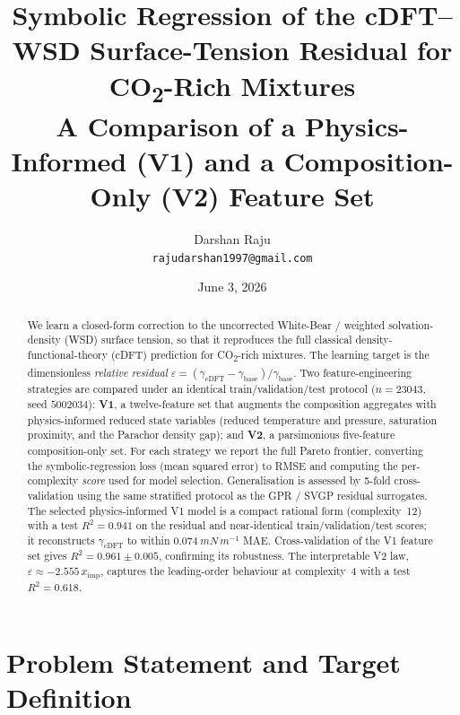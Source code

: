 \documentclass[11pt]{article}
\title{\textbf{Symbolic Regression of the cDFT--WSD Surface-Tension
Residual for CO\textsubscript{2}-Rich Mixtures}\\[4pt]
\large A Comparison of a Physics-Informed (V1) and a
Composition-Only (V2) Feature Set}
\author{Darshan Raju\\\small\texttt{rajudarshan1997@gmail.com}}
\date{June 3, 2026}
\newcommand{\eps}{\varepsilon}
\newcommand{\gcDFT}{\gamma_{\mathrm{cDFT}}}
\newcommand{\gbase}{\gamma_{\mathrm{base}}}
\newcommand{\xim}{x_{\mathrm{imp}}}
\begin{document}
\maketitle

\begin{abstract}
\noindent
We learn a closed-form correction to the uncorrected White-Bear / weighted
solvation-density (WSD) surface tension, so that it reproduces the full
classical density-functional-theory (cDFT) prediction for CO\textsubscript{2}-rich
mixtures. The learning target is the dimensionless \emph{relative residual}
$\eps=(\gcDFT-\gbase)/\gbase$. Two feature-engineering strategies are
compared under an identical train/validation/test protocol
($n=\num{23043}$, seed $5002034$): \textbf{V1}, a twelve-feature set that
augments the composition aggregates with physics-informed reduced state
variables (reduced temperature and pressure, saturation proximity, and the
Parachor density gap); and \textbf{V2}, a parsimonious five-feature
composition-only set. For each strategy we report the full Pareto frontier,
converting the symbolic-regression loss (mean squared error) to RMSE and
computing the per-complexity \emph{score} used for model selection.
Generalisation is assessed by 5-fold cross-validation using the same
stratified protocol as the GPR / SVGP residual surrogates. The selected
physics-informed V1 model is a compact rational form (complexity~12) with a
test $R^2=0.941$ on the residual and near-identical train/validation/test
scores; it reconstructs $\gcDFT$ to within $\SI{0.074}{mN\,m^{-1}}$ MAE.
Cross-validation of the V1 feature set gives $R^2=0.961\pm0.005$, confirming
its robustness. The interpretable V2 law, $\eps\approx-2.555\,\xim$, captures
the leading-order behaviour at complexity~4 with a test $R^2=0.618$.
\end{abstract}

\section{Problem Statement and Target Definition}
\end{document}
